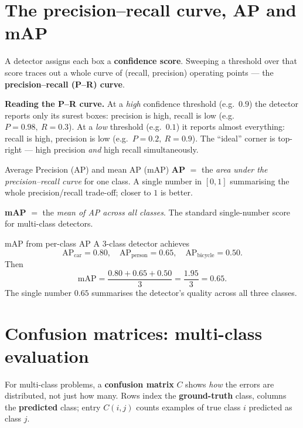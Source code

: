 \documentclass{report}
\begin{document}
\section{The precision--recall curve, AP and mAP}

A detector assigns each box a \textbf{confidence score}. Sweeping a threshold
over that score traces out a whole curve of (recall, precision) operating
points --- the \textbf{precision--recall (P--R) curve}.

\begin{keybox}
\textbf{Reading the P--R curve.} At a \emph{high} confidence threshold (e.g.\
$0.9$) the detector reports only its surest boxes: precision is high, recall is
low (e.g.\ $P=0.98,\ R=0.3$). At a \emph{low} threshold (e.g.\ $0.1$) it reports
almost everything: recall is high, precision is low (e.g.\ $P=0.2,\ R=0.9$). The
``ideal'' corner is top-right --- high precision \emph{and} high recall
simultaneously.
\end{keybox}

\begin{defbox}{Average Precision (AP) and mean AP (mAP)}
\textbf{AP} $=$ the \emph{area under the precision--recall curve} for one class.
A single number in $[0,1]$ summarising the whole precision/recall trade-off;
closer to $1$ is better.

\medskip
\textbf{mAP} $=$ the \emph{mean of AP across all classes}. The standard
single-number score for multi-class detectors.
\end{defbox}

\begin{exbox}{mAP from per-class AP}
A $3$-class detector achieves
\[
\text{AP}_{\text{car}} = 0.80,\quad
\text{AP}_{\text{person}} = 0.65,\quad
\text{AP}_{\text{bicycle}} = 0.50 .
\]
Then
\[
\text{mAP} = \frac{0.80 + 0.65 + 0.50}{3} = \frac{1.95}{3} = 0.65 .
\]
The single number $0.65$ summarises the detector's quality across all three
classes.
\end{exbox}

\section{Confusion matrices: multi-class evaluation}

For multi-class problems, a \textbf{confusion matrix} $C$ shows \emph{how} the
errors are distributed, not just how many. Rows index the \textbf{ground-truth}
class, columns the \textbf{predicted} class; entry $C(i,j)$ counts examples of
true class $i$ predicted as class $j$.
\end{document}
